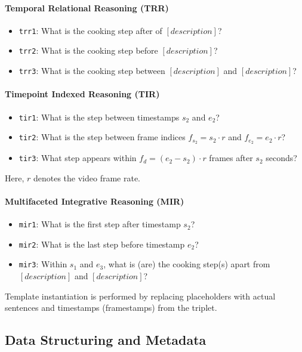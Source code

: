 \paragraph{Temporal Relational Reasoning (TRR)}
\begin{itemize}
    \item \texttt{trr1}: What is the cooking step after of $[description]$?
    \item \texttt{trr2}: What is the cooking step before $[description]$?
    \item \texttt{trr3}: What is the cooking step between $[description]$ and $[description]$?
\end{itemize}

\paragraph{Timepoint Indexed Reasoning (TIR)}
\begin{itemize}
    \item \texttt{tir1}: What is the step between timestamps $s_2$ and $e_2$?
    \item \texttt{tir2}: What is the step between frame indices $f_{s_2} = s_2 \cdot r$ and $f_{e_2} = e_2 \cdot r$?
    \item \texttt{tir3}: What step appears within $f_{d} = (e_2 - s_2) \cdot r$ frames after $s_2$ seconds?
\end{itemize}
Here, $r$ denotes the video frame rate.

\paragraph{Multifaceted Integrative Reasoning (MIR)}
\begin{itemize}
    \item \texttt{mir1}: What is the first step after timestamp $s_2$?
    \item \texttt{mir2}: What is the last step before timestamp $e_2$?
    \item \texttt{mir3}: Within $s_1$ and $e_3$, what is (are) the cooking step(s) apart from $[description]$ and $[description]$?
\end{itemize}

Template instantiation is performed by replacing placeholders with actual sentences and timestamps (framestamps) from the triplet.

\subsection{Data Structuring and Metadata}

